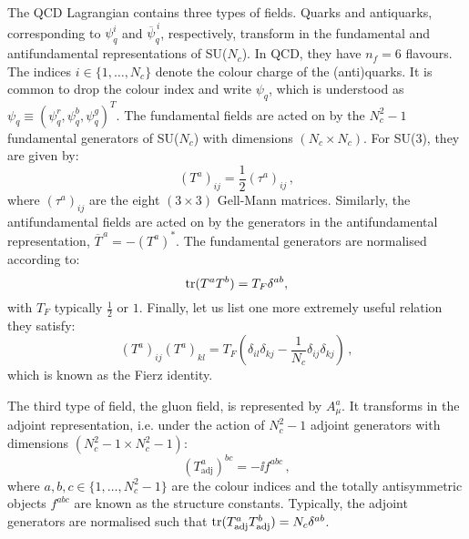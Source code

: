 \documentclass[main.tex]{subfiles}
\begin{document}
The QCD Lagrangian contains three types of fields. Quarks and antiquarks, corresponding to $\psi_q^i$ and $\overline{\psi}_q^{\,i}$, respectively, transform in the fundamental and antifundamental representations of SU($N_c$). In QCD, they have $n_f = 6$ flavours. The indices $i \in \{1,\ldots,N_c\}$ denote the colour charge of the (anti)quarks. It is common to drop the colour index and write $\psi_q$, which is understood as $\psi_q \equiv \left(\psi_q^r, \psi_q^b, \psi_q^g \right)^T$. The fundamental fields are acted on by the $N_c^2-1$ fundamental generators of SU($N_c$) with dimensions $(N_c \times N_c)$. For SU(3), they are given by:
\begin{equation}
    (T^a)_{ij} = \frac{1}{2} (\tau^a)_{ij}\,,
\end{equation}
where $(\tau^a)_{ij}$ are the eight $(3 \times 3)$ Gell-Mann matrices. Similarly, the antifundamental fields are acted on by the generators in the antifundamental representation, $\overline{T}^{\,a} = -\left(T^a\right)^\ast$. The fundamental generators are normalised according to:
\begin{equation}
    \operatorname{\rm tr} (T^aT^b) = T_F \delta^{ab},
\end{equation}
with $T_F$ typically $\frac{1}{2}$ or $1$. Finally, let us list one more extremely useful relation they satisfy:
\begin{equation} \label{eq:fierzcolour}
    (T^a)_{ij} (T^a)_{kl} = T_F \left( \delta_{il} \delta_{kj} - \frac{1}{N_c} \delta_{ij} \delta_{kj} \right)\,,
\end{equation}
which is known as the Fierz identity.

The third type of field, the gluon field, is represented by $A^a_\mu$. It transforms in the adjoint representation, i.e. under the action of $N_c^2-1$ adjoint generators with dimensions $(N_c^2-1 \times  N_c^2-1)$:
\begin{equation}
\left(T_\text{adj}^a\right)^{bc} = -\ii f^{abc}\,,
\end{equation}
where $a,b,c \in \{1, \ldots, N_c^2-1\}$ are the colour indices and the totally antisymmetric objects $f^{abc}$ are known as the structure constants. Typically, the adjoint generators are normalised such that $\operatorname{\rm tr} (T_\text{adj}^aT_\text{adj}^b) = N_c \delta^{ab}$. 
\end{document}

